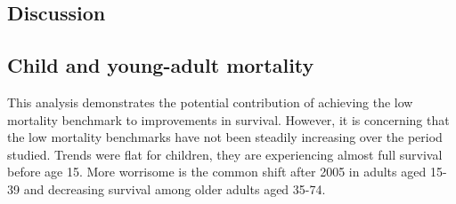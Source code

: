\documentclass[11.5pt]{article}
\begin{document}
\begin{spacing}{1.5}




\section*{Discussion}
\subsection*{Child and young-adult mortality}

This analysis demonstrates the potential contribution of achieving the low mortality benchmark to improvements in survival. However, it is concerning that the low mortality benchmarks have not been steadily increasing over the period studied. Trends were flat for children, they are experiencing almost full survival before age 15. More worrisome is the common shift after 2005 in adults aged 15-39 and decreasing survival among older adults aged 35-74.


\end{spacing}
\end{document}
